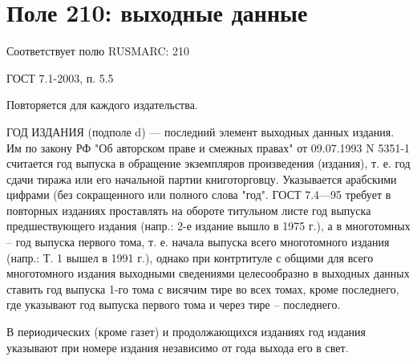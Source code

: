 \chapter*{Поле 210: выходные данные}

Соответствует полю RUSMARC: 210

ГОСТ 7.1-2003, п. 5.5

Повторяется для каждого издательства.

ГОД ИЗДАНИЯ (подполе d) — последний элемент выходных данных издания. Им по закону РФ "Об авторском праве и смежных правах" от 09.07.1993 N 5351-1 считается год выпуска в обращение экземпляров произведения (издания), т. е. год сдачи тиража или его начальной партии книготорговцу. Указывается арабскими цифрами (без сокращенного или полного слова "год". ГОСТ 7.4—95 требует в повторных изданиях проставлять на обороте титульном листе год выпуска предшествующего издания (напр.: 2-е издание вышло в 1975 г.), а в многотомных -- год выпуска первого тома, т. е. начала выпуска всего многотомного издания (напр.: Т. 1 вышел в 1991 г.), однако при контртитуле с общими для всего многотомного издания выходными сведениями целесообразно в выходных данных ставить год выпуска 1-го тома с висячим тире во всех томах, кроме последнего, где указывают год выпуска первого тома и через тире -- последнего.

В периодических (кроме газет) и продолжающихся изданиях год издания указывают при номере издания независимо от года выхода его в свет.
